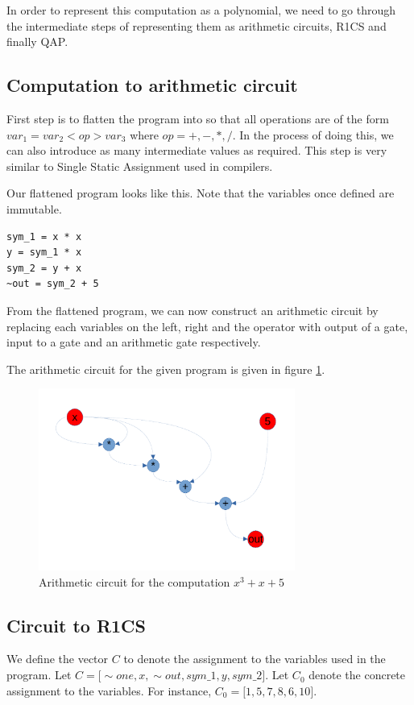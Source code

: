 \documentclass[twoside]{article}
\begin{document}
In order to represent this computation as a polynomial, we need to go through the intermediate steps of representing them as
arithmetic circuits, R1CS and finally QAP.

\subsection{Computation to arithmetic circuit}
First step is to flatten the program into so that all operations are of the form $var_1 = var_2 <op> var_3$ where $op = +, -, *, /$.
In the process of doing this, we can also introduce as many intermediate values as required. This step is very similar to 
Single Static Assignment used in compilers.

Our flattened program looks like this. Note that the variables once defined are immutable.

\begin{verbatim}
sym_1 = x * x
y = sym_1 * x
sym_2 = y + x
~out = sym_2 + 5
\end{verbatim}

From the flattened program, we can now construct an arithmetic circuit by replacing each variables on the left, right and the operator with
output of a gate, input to a gate and an arithmetic gate respectively.

The arithmetic circuit for the given program is given in figure \ref{f:circuit}.

\begin{figure}
\centering
\includegraphics[width=0.75\textwidth]{lecture12-circuit.pdf}
\caption{Arithmetic circuit for the computation $x^3 + x + 5$}
\label{f:circuit}
\end{figure}




\subsection{Circuit to R1CS}
We define the vector $C$ to denote the assignment to the variables used in the program. 
Let $C = \lbrack \sim one, x, \sim out, sym\text{\_}1, y, sym\text{\_}2 \rbrack$.
Let $C_0$ denote the concrete assignment to the variables. For instance, $C_0 = \lbrack 1, 5, 7, 8, 6, 10\rbrack$.
\end{document}
